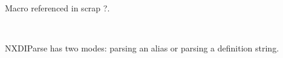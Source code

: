 \documentclass[12pt]{article}
\begin{document}
\begin{flushleft}
\begin{minipage}{\linewidth}
\begin{list}{}{}
\mbox{}\verb@         } @\\
\mbox{}\verb@         *pToken = '\0';@\\
\mbox{}\verb@         return pPtr;@\\
\mbox{}\verb@       }@\\
\mbox{}\verb@      /* not reached */@\\
\mbox{}\verb@      return pPtr;@\\
\mbox{}\verb@   }@\\
\mbox{}\verb@    @\\
\mbox{}\verb@@$\diamond$
\end{list}
\vspace{-1ex}
\footnotesize\addtolength{\baselineskip}{-1ex}
\begin{list}{}{\setlength{\itemsep}{-\parsep}\setlength{\itemindent}{-\leftmargin}}
\item Macro referenced in scrap ?.
\end{list}
\end{minipage}\\[4ex]
\end{flushleft}
NXDIParse has two modes: parsing an alias  or parsing a definition string.
 
\end{document}
